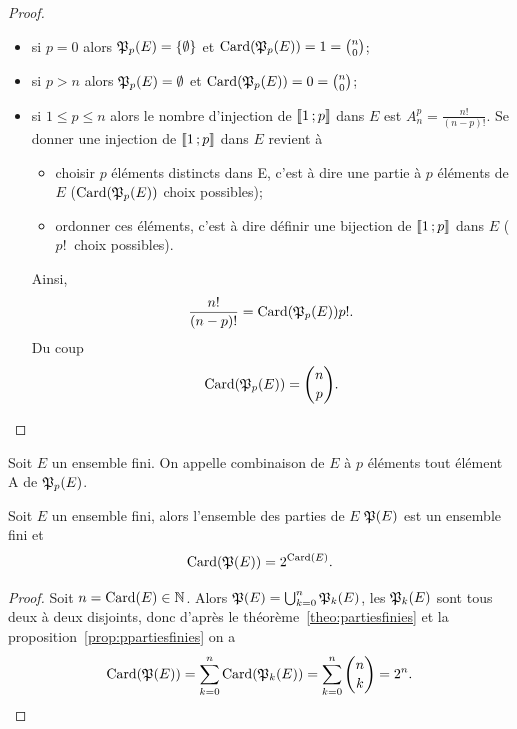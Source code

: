 \begin{proof}
  \begin{itemize}
    \item si \(p = 0\) alors \(\mathfrak{P}_p(E) = \{\emptyset\}\) et
      \(\operatorname{Card}(\mathfrak{P}_p(E)) = 1 = \binom{n}{0}\);
    \item si \(p>n\) alors \(\mathfrak{P}_p(E) = \emptyset\) et \(\operatorname{Card}(\mathfrak{P}_p(E)) = 0
      = \binom{n}{0}\);
    \item si \(1\leqslant p \leqslant n\) alors le nombre d'injection de
      \(\mathopen{\llbracket}1\mathclose{}\mathpunct{};p\mathclose{\rrbracket}\) dans \(E\) est \(A_{n}^p = \frac{n!}{(n -
      p)!}\).  Se donner une injection de  \(\mathopen{\llbracket}1\mathclose{}\mathpunct{};p\mathclose{\rrbracket}\) dans
      \(E\) revient à
      \begin{itemize}
        \item choisir \(p\) éléments distincts dans E, c'est à dire une partie à
          \(p\) éléments de \(E\) (\(\operatorname{Card}(\mathfrak{P}_p(E))\) choix possibles);
        \item ordonner ces éléments, c'est à dire définir une bijection de
          \(\mathopen{\llbracket}1\mathclose{}\mathpunct{};p\mathclose{\rrbracket}\) dans \(E\) (\(p!~\) choix possibles).
      \end{itemize}
      Ainsi,
      \begin{equation}
        \frac{n!}{(n - p)!} = \operatorname{Card}(\mathfrak{P}_p(E)) p!.
      \end{equation}
      Du coup
      \begin{equation}
        \operatorname{Card}(\mathfrak{P}_p(E)) = \binom{n}{p}.
      \end{equation}
  \end{itemize}
\end{proof}

\begin{defdef}
  Soit \(E\) un ensemble fini. On appelle combinaison de \(E\) à \(p\) éléments
  tout élément A de \(\mathfrak{P}_p(E)\).
\end{defdef}

\begin{prop}
  Soit \(E\) un ensemble fini, alors l'ensemble des parties de \(E\)
  \(\mathfrak{P}(E)\) est un ensemble fini et
  \begin{equation}
    \operatorname{Card}(\mathfrak{P}(E)) = 2^{\operatorname{Card}(E)}.
  \end{equation}
\end{prop}

\begin{proof}
  Soit \(n = \operatorname{Card}(E)\in \mathbb{N}\). Alors \(\mathfrak{P}(E) = \bigcup_{k =
  0}^{n}\mathfrak{P}_k(E)\), les \(\mathfrak{P}_k(E)\) sont tous deux à deux disjoints, donc
  d'après le théorème~\ref{theo:partiesfinies} et la
  proposition~\ref{prop:ppartiesfinies} on a
  \begin{equation}
    \operatorname{Card}(\mathfrak{P}(E)) = \sum_{k = 0}^n \operatorname{Card}(\mathfrak{P}_k(E)) = \sum_{k = 0}^n
    \binom{n}{k} = 2^n.
  \end{equation}
\end{proof}

